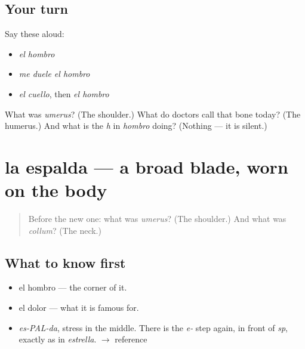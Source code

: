\subsection*{Your turn}
Say these aloud:

\begin{itemize}
\raggedright
  \item \emph{el hombro}
  \item \emph{me duele el hombro}
  \item \emph{el cuello}, then \emph{el hombro}
\end{itemize}

\begin{tcolorbox}[breakable,colback=teal!4,colframe=teal!35!black,title={Before you move on}]
What was \emph{umerus}? (The shoulder.) What do doctors call that bone today? (The humerus.) And what is the \emph{h} in \emph{hombro} doing? (Nothing — it is silent.)
\end{tcolorbox}
\section[la espalda]{la espalda — a broad blade, worn on the body}

\label{lesson:ES-C293-espalda}



\begin{quote}
Before the new one: what was \emph{umerus}? (The shoulder.) And what was \emph{collum}? (The neck.)
\end{quote}

\subsection*{What to know first}
\begin{itemize}
\raggedright
  \item el hombro — the corner of it.
  \item el dolor — what it is famous for.
\end{itemize}

\begin{sounds}
\begin{itemize}
\raggedright
  \item \emph{es-PAL-da}, stress in the middle. There is the \emph{e-} step again, in front of \emph{sp}, exactly as in \emph{estrella}. $\to$ reference
\end{itemize}
\end{sounds}

